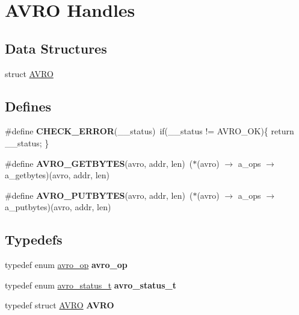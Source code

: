 \hypertarget{group___handle___routines}{
\section{AVRO Handles}
\label{group___handle___routines}
}
\subsection*{Data Structures}
\begin{CompactItemize}
\item 
struct \hyperlink{struct_a_v_r_o}{AVRO}
\end{CompactItemize}
\subsection*{Defines}
\begin{CompactItemize}
\item 
\hypertarget{group___handle___routines_gec7f77fb08d34504a65e49f23673e2f2}{
\#define \textbf{CHECK\_\-ERROR}(\_\-\_\-status)~if(\_\-\_\-status != AVRO\_\-OK)\{ return \_\-\_\-status; \}}
\label{group___handle___routines_gec7f77fb08d34504a65e49f23673e2f2}

\item 
\hypertarget{group___handle___routines_ga11bb99285d5512c5739aacb0b9352ca}{
\#define \textbf{AVRO\_\-GETBYTES}(avro, addr, len)~($\ast$(avro) $\rightarrow$ a\_\-ops $\rightarrow$ a\_\-getbytes)(avro, addr, len)}
\label{group___handle___routines_ga11bb99285d5512c5739aacb0b9352ca}

\item 
\hypertarget{group___handle___routines_gec949ab6bc010632000ad15f9adad118}{
\#define \textbf{AVRO\_\-PUTBYTES}(avro, addr, len)~($\ast$(avro) $\rightarrow$ a\_\-ops $\rightarrow$ a\_\-putbytes)(avro, addr, len)}
\label{group___handle___routines_gec949ab6bc010632000ad15f9adad118}

\end{CompactItemize}
\subsection*{Typedefs}
\begin{CompactItemize}
\item 
\hypertarget{group___handle___routines_g845b3c301ea3d376db7167e40b8cc77e}{
typedef enum \hyperlink{group___handle___routines_gcd8ee9ad4a4882eef8e3d9a0d5faec68}{avro\_\-op} \textbf{avro\_\-op}}
\label{group___handle___routines_g845b3c301ea3d376db7167e40b8cc77e}

\item 
\hypertarget{group___handle___routines_g0c34cda845744621fb4e6bb24b82c416}{
typedef enum \hyperlink{group___handle___routines_g4271ca78aabaaad628d7b632aa5a1499}{avro\_\-status\_\-t} \textbf{avro\_\-status\_\-t}}
\label{group___handle___routines_g0c34cda845744621fb4e6bb24b82c416}

\item 
\hypertarget{group___handle___routines_g6e3ec80aeb6c2317c76d6fb2a919b665}{
typedef struct \hyperlink{struct_a_v_r_o}{AVRO} \textbf{AVRO}}
\label{group___handle___routines_g6e3ec80aeb6c2317c76d6fb2a919b665}

\end{CompactItemize}
